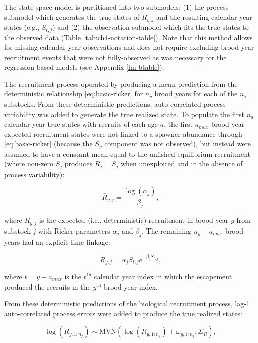 \documentclass[12pt,]{book}
\theoremstyle{definition}
\theoremstyle{definition}
\theoremstyle{definition}
\theoremstyle{remark}
\begin{document}
The state-space model is partitioned into two submodels: (1) the process
submodel which generates the true states of \(R_{y,j}\) and the
resulting calendar year states (e.g., \(S_{t,j}\)) and (2) the
observation submodel which fits the true states to the observed data
(Table \ref{tab:ch4-notation-table}). Note that this method allows for
missing calendar year observations and does not require excluding brood
year recruitment events that were not fully-observed as was necessary
for the regression-based models (see Appendix \ref{lm-btable}).

The recruitment process operated by producing a mean prediction from the
deterministic \citet{ricker-1954} relationship \eqref{eq:basic-ricker} for
\(n_y\) brood years for each of the \(n_j\) substocks. From these
deterministic predictions, auto-correlated process variability was added
to generate the true realized state. To populate the first \(n_a\)
calendar year true states with recruits of each age \(a\), the first
\(a_{max}\) brood year expected recruitment states were not linked to a
spawner abundance through \eqref{eq:basic-ricker} (because the \(S_y\)
component was not observed), but instead were assumed to have a constant
mean equal to the unfished equilibrium recruitment (where non-zero
\(S_j\) produces \(R_j = S_j\) when unexploited and in the absence of
process variability):

\begin{equation}
  \bar{R}_{y,j}=\frac{\log(\alpha_j)}{\beta_j},
  \label{eq:unfished-R0}
\end{equation}

\noindent
where \(\bar{R}_{y,j}\) is the expected (i.e., deterministic)
recruitment in brood year \(y\) from substock \(j\) with Ricker
parameters \(\alpha_j\) and \(\beta_j\). The remaining \(n_y - a_{max}\)
brood years had an explicit time linkage:

\begin{equation}
  \bar{R}_{y,j} = \alpha_j S_{t,j} e^{-\beta_j S_{t,j}},
  \label{eq:tsm-ricker-pred}
\end{equation}

\noindent
where \(t = y-a_{max}\) is the \(t^{\text{th}}\) calendar year index in
which the escapement produced the recruits in the \(y^{\text{th}}\)
brood year index.

From these deterministic predictions of the biological recruitment
process, lag-1 auto-correlated process errors were added to produce the
true realized states:

\begin{equation}
  \log(R_{y,1:n_j}) \sim \text{MVN}\left(\log(\bar{R}_{y,1:n_j}) + \omega_{y,1:n_j}, \Sigma_R\right),
  \label{eq:tsm-ricker-anomalies}
\end{equation}
\end{document}
